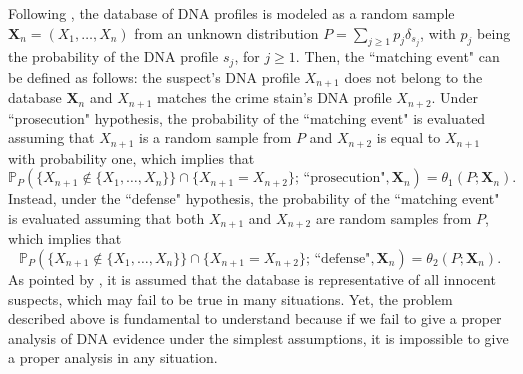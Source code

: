 \documentclass{article}
\newcommand{\1}{\boldsymbol{1}}
\theoremstyle{plain}
\begin{document}
Following  \cite{Bre(10)}, the database of DNA profiles is modeled as a random sample $\mathbf{X}_{n}=(X_{1},\ldots,X_{n})$ from an unknown distribution $P=\sum_{j\geq1}p_{j}\delta_{s_{j}}$, with $p_{j}$ being the probability of the DNA profile $s_{j}$, for $j\geq1$. Then, the ``matching event" can be defined as follows: the suspect's DNA profile $X_{n+1}$ does not belong to the database $\mathbf{X}_{n}$ and $X_{n+1}$ matches the crime stain's DNA profile $X_{n+2}$. Under ``prosecution" hypothesis, the probability of the ``matching event" is evaluated assuming that $X_{n+1}$ is a random sample from $P$ and $X_{n+2}$ is equal to $X_{n+1}$ with probability one, which implies that
\begin{equation}\label{prob_p}
\mathbb{P}_{P}(\{X_{n+1}\notin\{X_{1},\ldots,X_{n}\}\}\cap\{X_{n+1}=X_{n+2}\};\,\text{``prosecution"},\mathbf{X}_n)=\theta_1(P;\mathbf{X}_{n}).
\end{equation}
Instead, under the ``defense" hypothesis, the probability of the ``matching event" is evaluated assuming that both $X_{n+1}$ and $X_{n+2}$ are random samples from $P$, which implies that
\begin{equation}\label{prob_d}
\mathbb{P}_{P}(\{X_{n+1}\notin\{X_{1},\ldots,X_{n}\}\}\cap\{X_{n+1}=X_{n+2}\};\,\text{``defense"},\mathbf{X}_n)=\theta_{2}(P;\mathbf{X}_{n}).
\end{equation}
As pointed by \cite{Bre(10)}, it is assumed that the database is representative of all innocent suspects, which may fail to be true
in many situations. Yet, the problem described above is fundamental to understand because if we fail to give a proper analysis of DNA evidence under the simplest assumptions, it is impossible to give a proper analysis in any situation.
\end{document}
